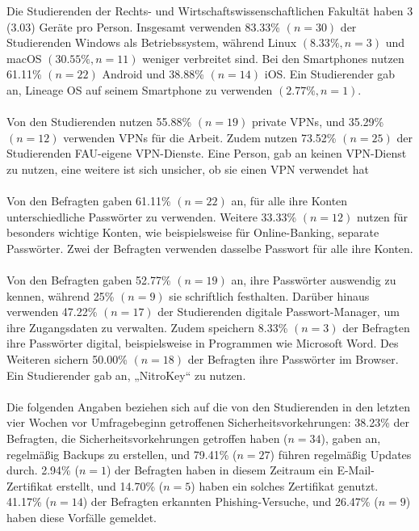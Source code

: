 \documentclass[german,report]{i1thesis}
\begin{document}
Die Studierenden der Rechts- und Wirtschaftswissenschaftlichen Fakultät haben 3 (3.03) Geräte pro Person. Insgesamt verwenden 83.33\% \((n = 30)\) der Studierenden Windows als Betriebssystem, während Linux \((8.33\%, n = 3)\) und macOS \((30.55\%, n = 11)\) weniger verbreitet sind. Bei den Smartphones nutzen 61.11\% \((n = 22)\) Android und 38.88\% \((n = 14)\) iOS. Ein Studierender gab an, Lineage OS auf seinem Smartphone zu verwenden \((2.77\%, n = 1)\).\\
\\
Von den Studierenden nutzen 55.88\% \((n = 19)\) private VPNs, und 35.29\% \((n = 12)\) verwenden VPNs für die Arbeit. Zudem nutzen 73.52\% \((n = 25)\) der Studierenden FAU-eigene VPN-Dienste. Eine Person, gab an keinen VPN-Dienst zu nutzen, eine weitere ist sich unsicher, ob sie einen VPN verwendet hat \\
\\
Von den Befragten gaben 61.11\% \((n=22)\) an, für alle ihre Konten unterschiedliche Passwörter zu verwenden. Weitere 33.33\% \((n=12)\) nutzen für besonders wichtige Konten, wie beispielsweise für Online-Banking, separate Passwörter. Zwei der Befragten verwenden dasselbe Passwort für alle ihre Konten.\\
\\
Von den Befragten gaben 52.77\% \((n=19)\) an, ihre Passwörter auswendig zu kennen, während 25\% \((n=9)\) sie schriftlich festhalten. Darüber hinaus verwenden 47.22\% \((n=17)\) der Studierenden digitale Passwort-Manager, um ihre Zugangsdaten zu verwalten. Zudem speichern 8.33\% \((n=3)\) der Befragten ihre Passwörter digital, beispielsweise in Programmen wie Microsoft Word. Des Weiteren sichern 50.00\% \((n=18)\) der Befragten ihre Passwörter im Browser.
Ein Studierender gab an, „NitroKey“ zu nutzen.\\
\\
Die folgenden Angaben beziehen sich auf die von den Studierenden in den letzten vier Wochen vor Umfragebeginn getroffenen Sicherheitsvorkehrungen: 38.23\% der Befragten, die Sicherheitsvorkehrungen getroffen haben (\(n = 34\)), gaben an, regelmäßig Backups zu erstellen, und 79.41\% (\(n = 27\)) führen regelmäßig Updates durch. 2.94\% (\(n = 1\)) der Befragten haben in diesem Zeitraum ein E-Mail-Zertifikat erstellt, und 14.70\% (\(n = 5\)) haben ein solches Zertifikat genutzt. 41.17\% (\(n = 14\)) der Befragten erkannten Phishing-Versuche, und 26.47\% (\(n = 9\)) haben diese Vorfälle gemeldet.\\
\\
\end{document}
